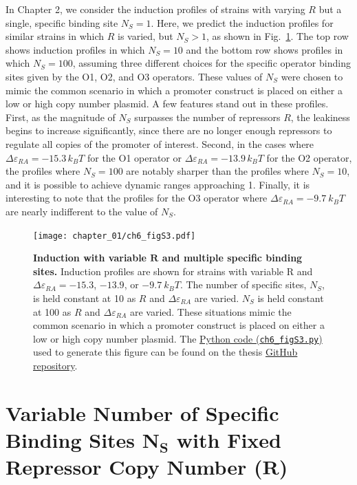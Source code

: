 \documentclass[12pt]{caltech_thesis}
\begin{document}
In Chapter 2, we consider the induction profiles of strains with varying
\(R\) but a single, specific binding site \(N_S = 1\). Here, we predict
the induction profiles for similar strains in which \(R\) is varied, but
\(N_S > 1\), as shown in Fig.~\ref{fig:fugacity_r}. The top row shows
induction profiles in which \(N_S = 10\) and the bottom row shows
profiles in which \(N_S = 100\), assuming three different choices for
the specific operator binding sites given by the O1, O2, and O3
operators. These values of \(N_S\) were chosen to mimic the common
scenario in which a promoter construct is placed on either a low or high
copy number plasmid. A few features stand out in these profiles. First,
as the magnitude of \(N_S\) surpasses the number of repressors \(R\),
the leakiness begins to increase significantly, since there are no
longer enough repressors to regulate all copies of the promoter of
interest. Second, in the cases where
\(\Delta \varepsilon_{RA} = -15.3\,k_B T\) for the O1 operator or
\(\Delta \varepsilon_{RA} = -13.9\,k_B T\) for the O2 operator, the
profiles where \(N_S = 100\) are notably sharper than the profiles where
\(N_S = 10\), and it is possible to achieve dynamic ranges approaching
1. Finally, it is interesting to note that the profiles for the O3
operator where \(\Delta \varepsilon_{RA} = -9.7~k_B T\) are nearly
indifferent to the value of \(N_S\).

\hypertarget{fig:fugacity_r}{%
\begin{figure}
\centering
\texttt{[image: chapter\_01/ch6\_figS3.pdf]}
\caption[{Induction with variable \(\boldsymbol{R}\) and multiple
specific binding sites.}]{\textbf{Induction with variable
\(\boldsymbol{R}\) and multiple specific binding sites.} Induction
profiles are shown for strains with variable R and
\(\Delta \varepsilon_{RA} = -15.3\), \(-13.9\), or \(-9.7~k_B T\). The
number of specific sites, \(N_S\), is held constant at 10 as \(R\) and
\(\Delta \varepsilon_{RA}\) are varied. \(N_S\) is held constant at 100
as \(R\) and \(\Delta \varepsilon_{RA}\) are varied. These situations
mimic the common scenario in which a promoter construct is placed on
either a low or high copy number plasmid. The
\href{https://github.com/gchure/phd/blob/master/src/chapter_06/code/ch6_figS3.py}{Python
code (\texttt{ch6\_figS3.py})} used to generate this figure can be found
on the thesis \href{https://github.com/gchure/phd}{GitHub repository}.}
\label{fig:fugacity_r}
\end{figure}
}

\hypertarget{variable-number-of-specific-binding-sites-boldsymboln_s-with-fixed-repressor-copy-number-boldsymbolr}{%
\section{\texorpdfstring{Variable Number of Specific Binding Sites
\(\boldsymbol{N_S}\) with Fixed Repressor Copy Number
(\(\boldsymbol{R}\))}{Variable Number of Specific Binding Sites \textbackslash boldsymbol\{N\_S\} with Fixed Repressor Copy Number (\textbackslash boldsymbol\{R\})}}\label{variable-number-of-specific-binding-sites-boldsymboln_s-with-fixed-repressor-copy-number-boldsymbolr}}
\end{document}
